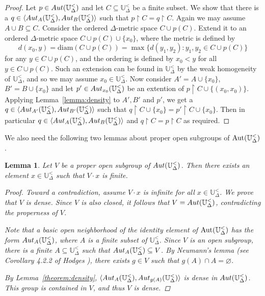 \documentclass{amsart}
\newtheorem{lemma}[theorem]{Lemma}
\theoremstyle{definition}
\theoremstyle{remark}
\begin{document}
\begin{proof}   Let $p \in {\rm Aut}(\mathbb{U}_{\Delta}^<)$ and let $C \subseteq \mathbb{U}_{\Delta}^<$ be a finite subset. We show that there is a $q \in \langle {\rm Aut}_A(\mathbb{U}_{\Delta}^<), {\rm Aut}_B(\mathbb{U}_{\Delta}^<) \rangle$ such that $p\upharpoonright C=q\upharpoonright C$. Again we may assume $A\cup B \subseteq C$. Consider the ordered $\Delta$-metric space $C \cup p(C)$. Extend it to an ordered $\Delta$-metric space $C \cup p(C) \cup \{x_0\}$, where the metric is defined by 
$$d(x_0,y)=\mbox{diam}(C\cup p(C))=\max\{d(y_1,y_2)\colon y_1,y_2 \in C \cup p(C)\}$$
for any $y\in C\cup p(C)$, and the ordering is defined by $x_0 <y$ for all $y\in C\cup p(C)$.
           Such an extension can be found in $\mathbb{U}_{\Delta}^<$ by the weak homogeneity of $\mathbb{U}^<_\Delta$, and so we may assume $x_0 \in \mathbb{U}_{\Delta}^<$. Now consider $A' = A \cup \{x_0\}$, $B' = B \cup \{x_0\}$ and let $p' \in {\rm Aut}_{x_0}(\mathbb{U}_\Delta^<)$ be an extention of $p\upharpoonright C \cup \{(x_0,x_0)\}$. Applying Lemma~\ref{lemma:density} to $A', B'$ and $p'$, we get a $q \in \langle {\rm Aut}_{A'}(\mathbb{U}_{\Delta}^<), {\rm Aut}_{B'}(\mathbb{U}_{\Delta}^<) \rangle$ such that $q\upharpoonright C\cup\{x_0\}=p'\upharpoonright C\cup\{x_0\}$. Then in particular $q \in \langle {\rm Aut}_A(\mathbb{U}_{\Delta}^<), {\rm Aut}_B(\mathbb{U}_{\Delta}^<) \rangle$ and $q\upharpoonright C=p\upharpoonright C$ as required. 
        \end{proof}
 
We also need the following two lemmas about proper open subgroups of $\mbox{\rm Aut}(\mathbb{U}^<_\Delta)$.    

     \begin{lemma}\label{lemma:f_orbit}
        Let $V$ be a proper open subgroup of ${\rm Aut}(\mathbb{U}_{\Delta}^<)$. Then there exists an element $x \in \mathbb{U}_{\Delta}^<$ such that $V\cdot x$ is finite.
        \begin{proof}
           Toward a contradiction, assume $V\cdot x$ is infinite for all $x\in \mathbb{U}_{\Delta}^<$. We prove that $V$ is dense. Since $V$ is also closed, it follows that $V = {\rm Aut}(\mathbb{U}_{\Delta}^<)$, contradicting the properness of $V$. 

Note that a basic open neighborhood of the identity element of $\mbox{\rm Aut}(\mathbb{U}^<_\Delta)$ has the form ${\rm Aut}_{A}(\mathbb{U}_{\Delta}^<)$, where $A$ is a finite subset of $\mathbb{U}^<_\Delta$. Since $V$ is an open subgroup, there is a finite $A\subseteq \mathbb{U}^<_\Delta$ such that ${\rm Aut}_{A}(\mathbb{U}_{\Delta}^<) \subseteq V$. By Neumann's lemma (see Corollary 4.2.2 of Hodges \cite{Hodges}), there exists $g \in V$ such that $g(A)\cap A = \varnothing$. 
           
By Lemma~\ref{theorem:density}, $\langle {\rm Aut}_{A}(\mathbb{U}_{\Delta}^<), {\rm Aut}_{g(A)}(\mathbb{U}_{\Delta}^<) \rangle$ is dense in ${\rm Aut}(\mathbb{U}_{\Delta}^<)$. This group is contained in $V$, and thus $V$ is dense. 
        \end{proof}
     \end{lemma}
\end{document}
